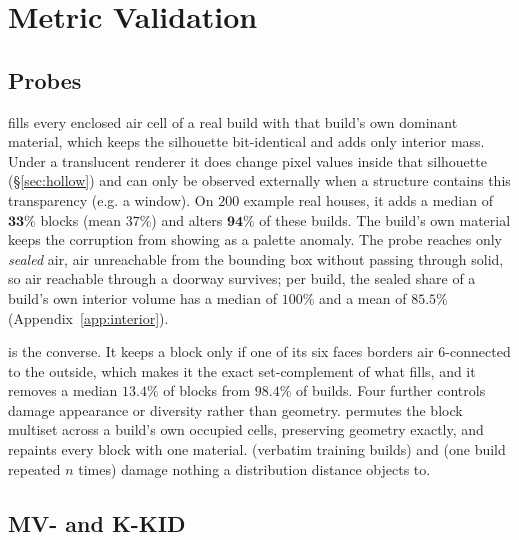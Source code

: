 \section{Metric Validation}
\label{sec:method}

\subsection{Probes}
\label{sec:probes}

\solidify{} fills every enclosed air cell of a real build with that build's own dominant
material, which keeps the silhouette bit-identical and adds only interior mass. Under a
translucent renderer it does change pixel values inside that silhouette
(\S\ref{sec:hollow}) and can only be observed externally when a structure contains this transparency (e.g. a window). On $200$ example real houses, it adds a median of $\mathbf{33\%}$
blocks (mean $37\%$) and alters $\mathbf{94\%}$ of these builds. The build's own material keeps
the corruption from showing as a palette anomaly. The probe reaches only \emph{sealed} air, air
unreachable from the bounding box without passing through solid, so air reachable through a
doorway survives; per build, the sealed share of a build's own interior volume has a median
of $100\%$ and a mean of $\mathbf{85.5\%}$ (Appendix~\ref{app:interior}).

\hollow{} is the converse. It keeps a block only if one of its six faces borders air
$6$-connected to the outside, which makes it the exact set-complement of what \solidify{}
fills, and it removes a median $13.4\%$ of blocks from $98.4\%$ of builds. Four further
controls damage appearance or diversity rather than geometry. \matshuffle{} permutes the
block multiset across a build's own occupied cells, preserving geometry exactly, and
\monochrome{} repaints every block with one material. \traincopy{} (verbatim training
builds) and \singlemode{} (one build repeated $n$ times) damage nothing a distribution
distance objects to.

\subsection{MV- and K-KID}

